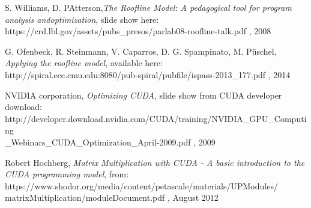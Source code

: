 \documentclass[12pt]{report}
\newcommand\blankpage{%
	\null
	\thispagestyle{empty}%
	\addtocounter{page}{-1}%
	\newpage}
\begin{document}
\begin{thebibliography}{9}
		S. Williams, D. PAtterson,\textit{The Roofline Model: A pedagogical tool for program analysis andoptimization}, slide show here:\\
		https://crd.lbl.gov/assets/pubs\_presos/parlab08-roofline-talk.pdf , 2008
		
		G. Ofenbeck, R. Steinmann, V. Caparros, D. G. Spampinato, M. Püschel, \textit{Applying the roofline model}, available here:\\
		http://spiral.ece.cmu.edu:8080/pub-spiral/pubfile/ispass-2013\_177.pdf , 2014
		
		NVIDIA corporation, \textit{Optimizing CUDA}, slide show from CUDA developer download:\\
		http://developer.download.nvidia.com/CUDA/training/NVIDIA\_GPU\_Computing\\\_Webinars\_CUDA\_Optimization\_April-2009.pdf , 2009
		
		
		Robert Hochberg, \textit{Matrix Multiplication with CUDA - A basic introduction to the CUDA programming model}, from:\\
		https://www.shodor.org/media/content/petascale/materials/UPModules/\\matrixMultiplication/moduleDocument.pdf , August 2012
		
		
		
		
		
	\end{thebibliography}
 
    
    \afterpage{\blankpage}
    
    

\end{document}
